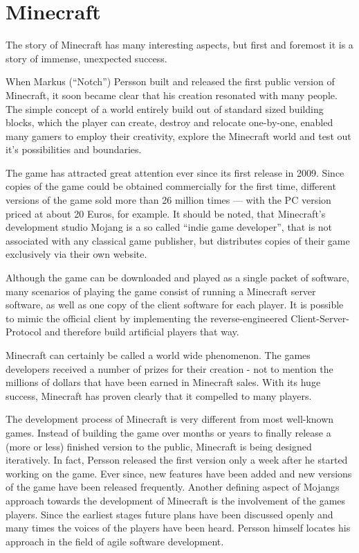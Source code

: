 \chapter{Minecraft}
The story of Minecraft has many interesting aspects, but first and foremost it is a story of immense, unexpected success.

When Markus (``Notch'') Persson built and released the first public version of Minecraft, it soon became clear that his creation resonated with many people. The simple concept of a world entirely build out of standard sized building blocks, which the player can create, destroy and relocate one-by-one, enabled many gamers to employ their creativity, explore the Minecraft world and test out it's possibilities and boundaries.

The game has attracted great attention ever since its first release in 2009. Since copies of the game could be obtained commercially for the first time, different versions of the game sold more than 26 million times --- with the PC version priced at about 20 Euros, for example. It should be noted, that Minecraft's development studio Mojang is a so called ``indie game developer'', that is not associated with any classical game publisher, but distributes copies of their game exclusively via their own website.

Although the game can be downloaded and played as a single packet of software, many scenarios of playing the game consist of running a Minecraft server software, as well as one copy of the client software for each player. It is possible to mimic the official client by implementing the reverse-engineered Client-Server-Protocol and therefore build artificial players that way.

Minecraft can certainly be called a world wide phenomenon. The games developers received a number of prizes for their creation - not to mention the millions of dollars that have been earned in Minecraft sales. With its huge success, Minecraft has proven clearly that it compelled to many players.~\cite{Duncan:2011:MBC:2207096.2207097}

The development process of Minecraft is very different from most well-known games. Instead of building the game over months or years to finally release a (more or less) finished version to the public, Minecraft is being designed iteratively. In fact, Persson released the first version only a week after he started working on the game. Ever since, new features have been added and new versions of the game have been released frequently. Another defining aspect of Mojangs approach towards the development of Minecraft is the involvement of the games players. Since the earliest stages future plans have been discussed openly and many times the voices of the players have been heard. Persson himself locates his approach in the field of agile software development.~\cite{Duncan:2011:MBC:2207096.2207097}

